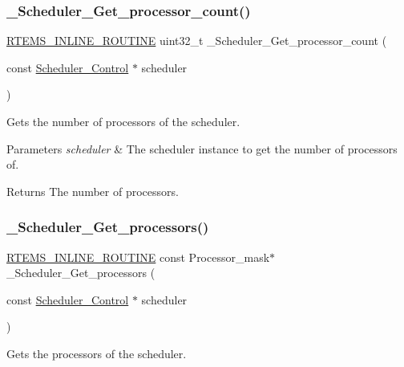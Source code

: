 \subsubsection{\texorpdfstring{\_Scheduler\_Get\_processor\_count()}{\_Scheduler\_Get\_processor\_count()}}
{\footnotesize\ttfamily \mbox{\hyperlink{group__RTEMSScoreBaseDefs_gac216239df231d5dbd15e3520b0b9313f}{R\+T\+E\+M\+S\+\_\+\+I\+N\+L\+I\+N\+E\+\_\+\+R\+O\+U\+T\+I\+NE}} uint32\+\_\+t \+\_\+\+Scheduler\+\_\+\+Get\+\_\+processor\+\_\+count (\begin{DoxyParamCaption}\item[{const \mbox{\hyperlink{struct__Scheduler__Control}{Scheduler\+\_\+\+Control}} $\ast$}]{scheduler }\end{DoxyParamCaption})}



Gets the number of processors of the scheduler. 


\begin{DoxyParams}{Parameters}
{\em scheduler} & The scheduler instance to get the number of processors of.\\
\hline
\end{DoxyParams}
\begin{DoxyReturn}{Returns}
The number of processors. 
\end{DoxyReturn}
\mbox{\label{group__RTEMSScoreScheduler_gaa375cf17f43fdd86fcc85aa5394132a3}} 
\subsubsection{\texorpdfstring{\_Scheduler\_Get\_processors()}{\_Scheduler\_Get\_processors()}}
{\footnotesize\ttfamily \mbox{\hyperlink{group__RTEMSScoreBaseDefs_gac216239df231d5dbd15e3520b0b9313f}{R\+T\+E\+M\+S\+\_\+\+I\+N\+L\+I\+N\+E\+\_\+\+R\+O\+U\+T\+I\+NE}} const Processor\+\_\+mask$\ast$ \+\_\+\+Scheduler\+\_\+\+Get\+\_\+processors (\begin{DoxyParamCaption}\item[{const \mbox{\hyperlink{struct__Scheduler__Control}{Scheduler\+\_\+\+Control}} $\ast$}]{scheduler }\end{DoxyParamCaption})}



Gets the processors of the scheduler. 


